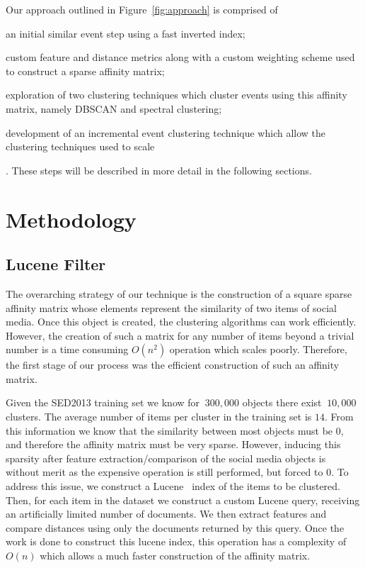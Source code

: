 \documentclass{../acm_proc_article-me11_tweaked}
\begin{document}
Our approach outlined in Figure~\ref{fig:approach} is comprised of \begin{inparaenum}
\item an initial similar event step using a fast inverted index;
\item custom feature and distance metrics along with a custom weighting scheme used to construct a sparse affinity matrix;
\item exploration of two clustering techniques which cluster events using this affinity matrix, namely DBSCAN and spectral clustering;
\item development of an incremental event clustering technique which allow the clustering techniques used to scale
\end{inparaenum}. These steps will be described in more detail in the following sections.

\section{Methodology} %
\label{sec:methodology}

\subsection{Lucene Filter} %
\label{sub:lucene_filter}
The overarching strategy of our technique is the construction of a square sparse affinity matrix whose elements represent the similarity of two items of social media. Once this object is created, the clustering algorithms can work efficiently. However, the creation of such a matrix for any number of items beyond a trivial number is a time consuming $O(n^2)$ operation which scales poorly. Therefore, the first stage of our process was the efficient construction of such an affinity matrix. 

Given the SED2013 training set we know for $~300,000$ objects there exist $~10,000$ clusters. The average number of items per cluster in the training set is $14$. From this information we know that the similarity between most objects must be 0, and therefore the affinity matrix must be very sparse. However, inducing this sparsity after feature extraction/comparison of the social media objects is without merit as the expensive operation is still performed, but forced to 0. To address this issue, we construct a Lucene~\cite{????} index of the items to be clustered. Then, for each item in the dataset we construct a custom Lucene query, receiving an artificially limited number of documents. We then extract features and compare distances using only the documents returned by this query. Once the work is done to construct this lucene index, this operation has a complexity of $O(n)$ which allows a much faster construction of the affinity matrix.
\end{document}
